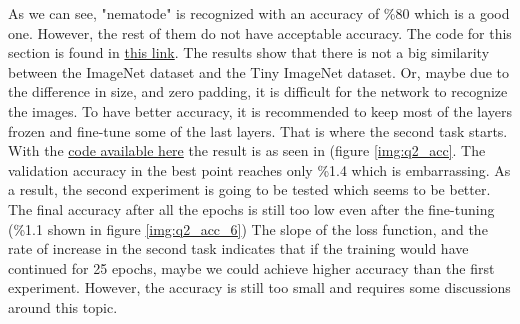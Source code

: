 \documentclass[12pt,oneside,geqno]{article}
\begin{document}
	As we can see, "nematode" is recognized with an accuracy of \%80 which is a good one. However, the rest of them do not have acceptable accuracy. The code for this section is found in \href{https://colab.research.google.com/drive/1LOb1nhmdRy_zXkRVinynlgsTIWOysq0U?authuser=1#scrollTo=ilivBxZyQNZY\&line=1\&uniqifier=1}{this link}. The results show that there is not a big similarity between the ImageNet dataset and the Tiny ImageNet dataset. Or, maybe due to the difference in size, and zero padding, it is difficult for the network to recognize the images. To have better accuracy, it is recommended to keep most of the layers frozen and fine-tune some of the last layers. That is where the second task starts. With the \href{https://colab.research.google.com/drive/1LOb1nhmdRy_zXkRVinynlgsTIWOysq0U?authuser=1#scrollTo=7J7lbaO3QTNK\&line=1\&uniqifier=1}{code available here} the result is as seen in (figure \ref{img:q2_acc}. The validation accuracy in the best point reaches only \%1.4 which is embarrassing. As a result, the second experiment is going to be tested which seems to be better. The final accuracy after all the epochs is still too low even after the fine-tuning (\%1.1 shown in figure \ref{img:q2_acc_6}) The slope of the loss function, and the rate of increase in the second task indicates that if the training would have continued for 25 epochs, maybe we could achieve higher accuracy than the first experiment. However, the accuracy is still too small and requires some discussions around this topic.
	
\end{document}
